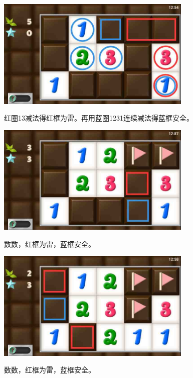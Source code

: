 \subsection{} %
\begin{center}
    \includegraphics[width=0.7\textwidth]{puzzlelow/23-1.jpg}
\end{center}
红圈13减法得红框为雷。再用蓝圈1231连续减法得蓝框安全。
\begin{center}
    \includegraphics[width=0.7\textwidth]{puzzlelow/23-2.jpg}
\end{center}
数数，红框为雷，蓝框安全。
\begin{center}
    \includegraphics[width=0.7\textwidth]{puzzlelow/23-3.jpg}
\end{center}
数数，红框为雷，蓝框安全。

